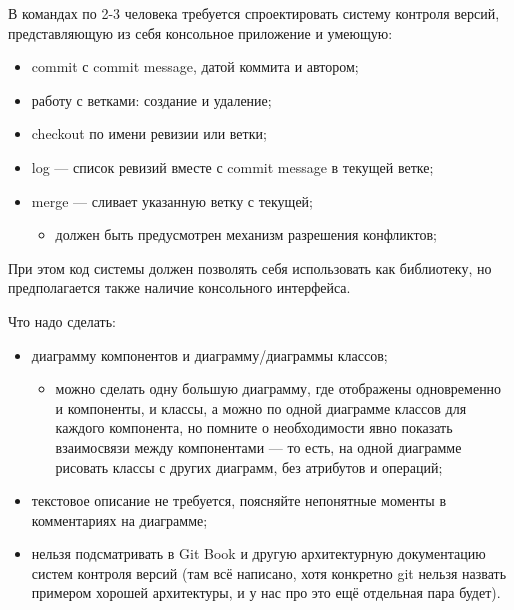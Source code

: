 \documentclass{../../text-style}
\begin{document}
\maketitle
\thispagestyle{empty}

В командах по 2-3 человека требуется спроектировать систему контроля версий, представляющую из себя консольное приложение и умеющую:

\begin{itemize}
    \item commit с commit message, датой коммита и автором;
    \item работу с ветками: создание и удаление;
    \item checkout по имени ревизии или ветки;
    \item log --- список ревизий вместе с commit message в текущей ветке;
    \item merge --- сливает указанную ветку с текущей;
    \begin{itemize}
        \item должен быть предусмотрен механизм разрешения конфликтов;
    \end{itemize}
\end{itemize}

При этом код системы должен позволять себя использовать как библиотеку, но предполагается также наличие консольного интерфейса.

Что надо сделать:

\begin{itemize}
    \item диаграмму компонентов и диаграмму/диаграммы классов;
    \begin{itemize}
        \item можно сделать одну большую диаграмму, где отображены одновременно и компоненты, и классы, а можно по одной диаграмме классов для каждого компонента, но помните о необходимости явно показать взаимосвязи между компонентами --- то есть, на одной диаграмме рисовать классы с других диаграмм, без атрибутов и операций;
    \end{itemize}
    \item текстовое описание не требуется, поясняйте непонятные моменты в комментариях на диаграмме;
    \item нельзя подсматривать в Git Book и другую архитектурную документацию систем контроля версий (там всё написано, хотя конкретно git нельзя назвать примером хорошей архитектуры, и у нас про это ещё отдельная пара будет).
\end{itemize}
\end{document}
